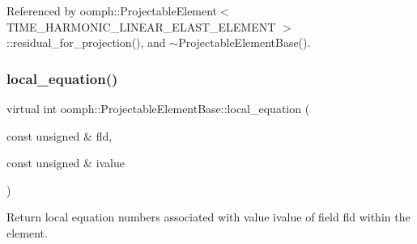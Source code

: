 Referenced by oomph\+::\+Projectable\+Element$<$ T\+I\+M\+E\+\_\+\+H\+A\+R\+M\+O\+N\+I\+C\+\_\+\+L\+I\+N\+E\+A\+R\+\_\+\+E\+L\+A\+S\+T\+\_\+\+E\+L\+E\+M\+E\+N\+T $>$\+::residual\+\_\+for\+\_\+projection(), and $\sim$\+Projectable\+Element\+Base().

\mbox{\label{classoomph_1_1ProjectableElementBase_ac5c27ae929ff636dc7747fe23fd4f738}} 
\subsubsection{\texorpdfstring{local\+\_\+equation()}{local\_equation()}}
{\footnotesize\ttfamily virtual int oomph\+::\+Projectable\+Element\+Base\+::local\+\_\+equation (\begin{DoxyParamCaption}\item[{const unsigned \&}]{fld,  }\item[{const unsigned \&}]{ivalue }\end{DoxyParamCaption})\hspace{0.3cm}{\ttfamily [pure virtual]}}



Return local equation numbers associated with value ivalue of field fld within the element. 



